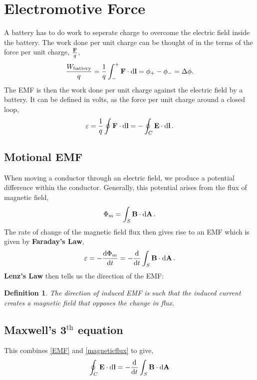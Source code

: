 \documentclass{book}
\newtheorem*{definition}{Definition}
\begin{document}
\section{Electromotive Force}
A battery has to do work to seperate charge to overcome the electric field inside the battery. The work done per unit charge can be thought of in the terms of the force per unit charge, $\frac{\vb{F}}{q}$,
\begin{equation}
    \frac{W_{\text{battery}}}{q} = \frac{1}{q}\int_-^+ \vb{F}\cdot\dd{\vb{l}} = \phi_+ - \phi_- = \Delta \phi. \label{forceperunitchargepotential}
\end{equation}
The EMF is then the work done per unit charge against the electric field by a battery. It can be defined in volts, as the force per unit charge around a closed loop,
\begin{equation}
    \varepsilon = \frac{1}{q}\oint \vb{F}\cdot \dd{\vb{l}} = -\oint_C \vb{E}\cdot\dd{\vb{l}}. \label{EMF}
\end{equation}
\subsection{Motional EMF}
When moving a conductor through an electric field, we produce a potential difference within the conductor. Generally, this potential arises from the flux of magnetic field,
\begin{equation}
    \Phi_m = \int_S \vb{B}\cdot\dd{\vb{A}}. \label{magneticflux}
\end{equation}
The rate of change of the magnetic field flux then gives rise to an EMF which is given by \textbf{Faraday's Law},
\begin{equation}
    \varepsilon = -\dv{\Phi_m}{t} = -\dv{}{t}\int_S\vb{B}\cdot\dd{\vb{A}}. \label{emf}
\end{equation}
\textbf{Lenz's Law} then tells us the direction of the EMF:
\begin{definition}
    The direction of induced EMF is such that the induced current creates a magnetic field that opposes the change in flux.
\end{definition}
\subsection{Maxwell's 3$^{\text{th}}$ equation}
This combines \eqref{EMF} and \eqref{magneticflux} to give,
\begin{equation}
    \oint_C\vb{E}\cdot\dd{\vb{l}} = -\dv{}{t}\int_S\vb{B}\cdot\dd{\vb{A}} \label{maxwell'sfourth}
\end{equation}
\end{document}
